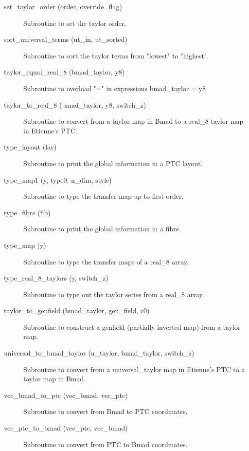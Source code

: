 \begin{description}
\item[set_taylor_order (order, override_flag)] \Newline
Subroutine to set the taylor order. 

\label{r:sort.universal.terms}
\item[sort_universal_terms (ut_in, ut_sorted)] \Newline
Subroutine to sort the taylor terms from "lowest" to "highest". 

\label{r:taylor.equal.real.8}
\item[taylor_equal_real_8 (bmad_taylor, y8)] \Newline
Subroutine to overload "=" in expressions bmad_taylor = y8 

\label{r:taylor.to.real.8}
\item[taylor_to_real_8 (bmad_taylor, y8, switch_z)] \Newline
Subroutine to convert from a taylor map in Bmad to a real_8 taylor map in Etienne's PTC. 

\label{r:type.layout}
\item[type_layout (lay)] \Newline
Subroutine to print the global information in a PTC layout.

\label{r:type.map1}
\item[type_map1 (y, type0, n_dim, style)] \Newline
Subroutine to type the transfer map up to first order. 

\label{r:type.fibre}
\item[type_fibre (fib)] \Newline
Subroutine to print the global information in a fibre.

\label{r:type.map}
\item[type_map (y)] \Newline
Subroutine to type the transfer maps of a real_8 array. 

\label{r:type.real.8.taylors}
\item[type_real_8_taylors (y, switch_z)] \Newline
Subroutine to type out the taylor series from a real_8 array. 

\label{r:taylor.to.genfield}
\item[taylor_to_genfield (bmad_taylor, gen_field, c0)] \Newline
Subroutine to construct a genfield (partially inverted map) from a taylor map. 

\label{r:universal.to.bmad.taylor}
\item[universal_to_bmad_taylor (u_taylor, bmad_taylor, switch_z)] \Newline
Subroutine to convert from a universal_taylor map in Etienne's PTC to a taylor map in Bmad. 

\label{r:vec.bmad.to.ptc}
\item[vec_bmad_to_ptc (vec_bmad, vec_ptc)] \Newline
Subroutine to convert from Bmad to PTC coordinates. 

\label{r:vec.ptc.to.bmad}
\item[vec_ptc_to_bmad (vec_ptc, vec_bmad)] \Newline
Subroutine to convert from PTC to Bmad coordinates. 

\end{description}

